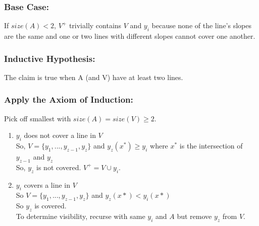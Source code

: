 \documentclass{article}
\begin{document}
\subsubsection*{Base Case:}
If $size(A) < 2$, $V^+$ trivially contains $V$ and $y_i$ because none of the line's slopes are the same and one or two lines with different slopes cannot cover one another.\\
\subsubsection*{Inductive Hypothesis:}
The claim is true when A (and V) have at least two lines.\\
\subsubsection*{Apply the Axiom of Induction:}
Pick off smallest with $size(A) = size(V) \geq 2$.\\
\begin{enumerate}
    \item $y_i$ does not cover a line in $V$\\
    So, $V = \{y_1, ..., y_{z-1}, y_z\}$ and $y_z(x^*) \geq y_i$ where $x^*$ is the intersection of $y_{z-1}$ and $y_z$\\
    So, $y_z$ is not covered. $V^+ = V \cup y_i$.

    \item $y_i$ covers a line in $V$\\
    So $V = \{y_1, ..., y_{z-1}, y_z\}$ and $y_z(x*) < y_i(x*)$\\
    So $y_z$ is covered.\\
    To determine visibility, recurse with same $y_i$ and $A$ but remove $y_z$ from $V$.\\
\end{enumerate}
\end{document}
